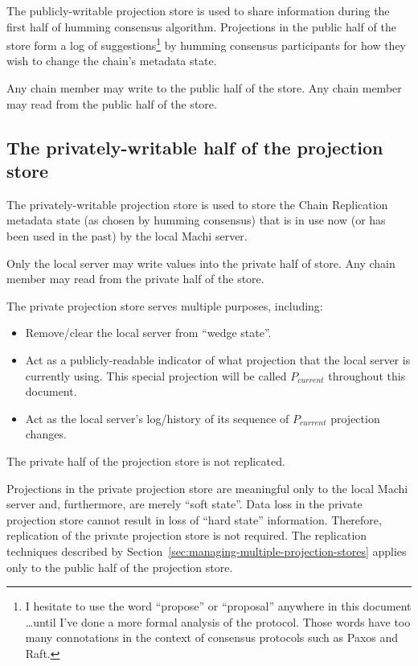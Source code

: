 \documentclass[preprint,10pt]{sigplanconf}
\begin{document}
The publicly-writable projection store is used to share information
during the first half of humming consensus algorithm.  Projections
in the public half of the store form a log of
suggestions\footnote{I hesitate to use the word ``propose'' or ``proposal''
  anywhere in this document \ldots until I've done a more formal
  analysis of the protocol.  Those words have too many connotations in
  the context of consensus protocols such as Paxos and Raft.}
by humming consensus participants for how they wish to change the
chain's metadata state.

Any chain member may write to the public half of the store.
Any chain member may read from the public half of the store.

\subsection{The privately-writable half of the projection store}

The privately-writable projection store is used to store the
Chain Replication metadata state (as chosen by humming consensus)
that is in use now (or has been used in the past) by the local Machi server.

Only the local server may write values into the private half of store.
Any chain member may read from the private half of the store.

The private projection store serves multiple purposes, including:

\begin{itemize}
\item Remove/clear the local server from ``wedge state''.
\item Act as a publicly-readable indicator of what projection that the
  local server is currently using.  This special projection will be
  called $P_{current}$ throughout this document.
\item Act as the local server's log/history of
  its sequence of $P_{current}$ projection changes.
\end{itemize}

The private half of the projection store is not replicated.

Projections in the private projection store are
meaningful only to the local Machi server and, furthermore, are
merely ``soft state''.  Data loss in the private projection store
cannot result in loss of ``hard state'' information.  Therefore,
replication of the private projection store is not required.  The
replication techniques described by
Section~\ref{sec:managing-multiple-projection-stores} applies only to
the public half of the projection store.
\end{document}

